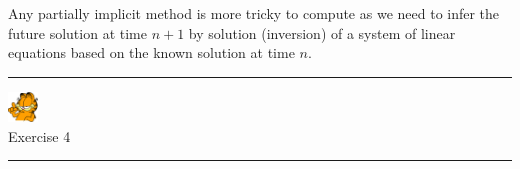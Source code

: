 Any partially implicit method is more tricky to compute as we need to infer the future solution 
at time $n+1$ by solution (inversion) of a system of linear equations based on the known solution at time $n$. 

\begin{center}

\end{center}


\begin{center}
\begin{minipage}[t]{0.77\textwidth}
\par\noindent\rule{\textwidth}{0.4pt}

\begin{center}
\includegraphics[width=0.8cm]{images/garftr} \\
{\color{orange}Exercise 4}
\end{center}

\par\noindent\rule{\textwidth}{0.4pt}
\end{minipage}
\end{center}





